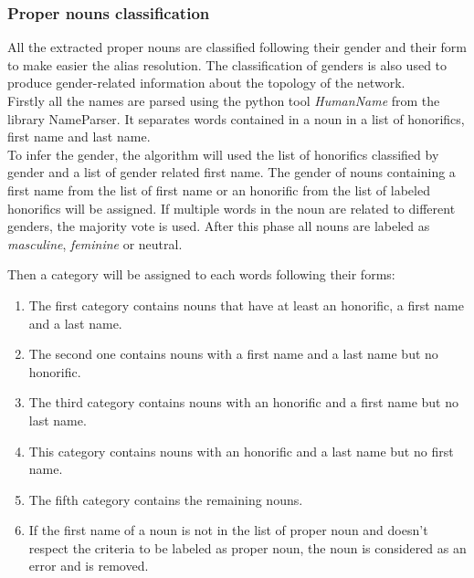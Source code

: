 \documentclass[a4paper, 12pt]{report}
\begin{document}
\subsubsection{Proper nouns classification}
\label{section:classification}
All the extracted proper nouns are classified following their gender and their form to make easier the alias resolution. The classification of genders is also used to produce gender-related information about the topology of the network.\\
Firstly all the names are parsed using the python tool \textit{HumanName} from the library {NameParser}. It separates words contained in a noun in a list of honorifics, first name and last name.\\

To infer the gender, the algorithm will used the list of honorifics classified by gender and a list of gender related first name. The gender of nouns containing a first name from the list of first name or an honorific from the list of  labeled honorifics will be assigned. If multiple words in the noun are related to different genders, the majority vote is used. After this phase all nouns are labeled as \textit{masculine}, \textit{feminine} or {neutral}.

Then a category will be assigned to each words following their forms:
\begin{enumerate}
	\item The first category contains nouns that have at least an honorific, a first name and a last name.
	\item The second one contains nouns with a first name and a last name but no honorific.
	\item The third category contains nouns with an honorific and a first name but no last name.
	\item This category contains nouns with an honorific and a last name but no first name.
	\item The fifth category contains the remaining nouns.
	 \item If the first name of a noun is not in the list of proper noun and doesn't respect the criteria to be labeled as proper noun, the noun is considered as an error and is removed.
\end{enumerate}
\end{document}
